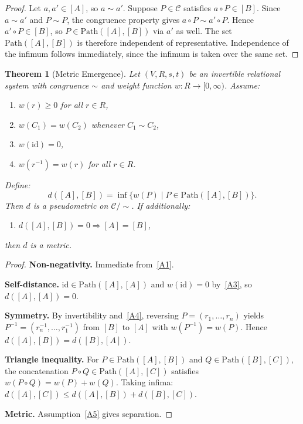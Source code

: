 \documentclass{article}
\newtheorem{theorem}{Theorem}[section]
\theoremstyle{definition}
\theoremstyle{remark}
\newcommand{\RC}{\mathcal{C}}
\newcommand{\id}{\mathrm{id}}
\begin{document}
\begin{proof}
Let $a, a' \in [A]$, so $a \sim a'$. Suppose $P \in \RC$ satisfies
$a \circ P \in [B]$. Since $a \sim a'$ and $P \sim P$, the
congruence property gives $a \circ P \sim a' \circ P$. Hence
$a' \circ P \in [B]$, so $P \in \mathrm{Path}([A],[B])$ via $a'$
as well. The set $\mathrm{Path}([A],[B])$ is therefore independent
of representative. Independence of the infimum follows immediately,
since the infimum is taken over the same set.
\end{proof}

\begin{theorem}[Metric Emergence]
\label{thm:metric}
Let $(V, R, s, t)$ be an invertible relational system with
congruence $\sim$ and weight function $w : R \to [0,\infty)$.
Assume:
\begin{enumerate}[label=(A\arabic*)]
  \item\label{A1} $w(r) \geq 0$ for all $r \in R$,
  \item\label{A2} $w(C_1) = w(C_2)$ whenever $C_1 \sim C_2$,
  \item\label{A3} $w(\id) = 0$,
  \item\label{A4} $w(r^{-1}) = w(r)$ for all $r \in R$.
\end{enumerate}
Define:
\[
  d([A],[B]) = \inf\bigl\{ w(P) \mid P \in \mathrm{Path}([A],[B])\bigr\}.
\]
Then $d$ is a \emph{pseudometric} on $\RC/{\sim}$. If additionally:
\begin{enumerate}[label=(A\arabic*), start=5]
  \item\label{A5} $d([A],[B]) = 0 \Rightarrow [A] = [B]$,
\end{enumerate}
then $d$ is a \emph{metric}.
\end{theorem}

\begin{proof}
\textbf{Non-negativity.} Immediate from~\ref{A1}.

\textbf{Self-distance.} $\id \in \mathrm{Path}([A],[A])$ and
$w(\id) = 0$ by~\ref{A3}, so $d([A],[A]) = 0$.

\textbf{Symmetry.} By invertibility and~\ref{A4}, reversing
$P = (r_1, \dots, r_n)$ yields $P^{-1} = (r_n^{-1}, \dots, r_1^{-1})$
from $[B]$ to $[A]$ with $w(P^{-1}) = w(P)$. Hence
$d([A],[B]) = d([B],[A])$.

\textbf{Triangle inequality.} For $P \in \mathrm{Path}([A],[B])$
and $Q \in \mathrm{Path}([B],[C])$, the concatenation
$P \circ Q \in \mathrm{Path}([A],[C])$ satisfies
$w(P \circ Q) = w(P) + w(Q)$. Taking infima:
$d([A],[C]) \leq d([A],[B]) + d([B],[C])$.

\textbf{Metric.} Assumption~\ref{A5} gives separation.
\end{proof}
\end{document}
